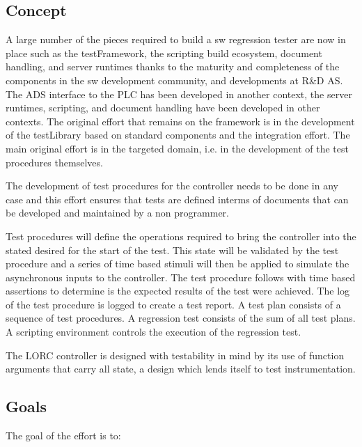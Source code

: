 \documentclass[11pt,english,twoside]{extarticle}
\begin{document}
\subsection*{Concept}
A large number of the pieces required to build a sw regression tester are now in place such as the testFramework, the scripting build ecosystem, document handling, and server runtimes thanks to the maturity and completeness of the components in the sw development community, and developments at R\&D AS. The ADS interface to the PLC has been developed in another context, the server runtimes, scripting, and document handling have been developed in other contexts. The original effort that remains on the framework is in the development of the testLibrary based on standard components and the integration effort. The main original effort is in the targeted domain, i.e. in the development of the test procedures themselves.

The development of test procedures for the controller needs to be done in any case and this effort ensures that tests are defined interms of documents that can be developed and maintained by a non programmer.

Test procedures will define the operations required to bring the controller into the stated desired for the start of the test. This state will be validated by the test procedure and a series of time based stimuli will then be applied to simulate the asynchronous inputs to the controller. The test procedure follows with time based assertions to determine is the expected results of the test were achieved. The log of the test procedure is logged to create a test report. A test plan consists of a sequence of test procedures. A regression test consists of the sum of all test plans. A scripting environment controls the execution of the regression test.

The LORC controller is designed with testability in mind by its use of function arguments that carry all state, a design which lends itself to test instrumentation.

\subsection*{Goals}
The goal of the effort is to:
\end{document}
